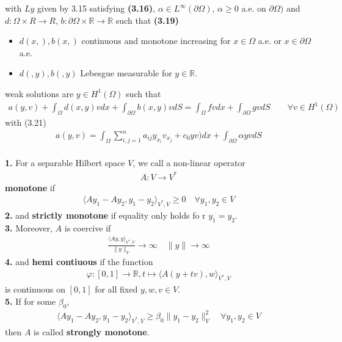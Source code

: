 with $Ly$ given by 3.15 satisfying\textbf{ (3.16)}, $\alpha \in L^\infty(\partial \Omega)$, $\alpha \geq 0$ a.e. on $\partial \Omega)$ and $d: \Omega \times R \rightarrow R$, $b: \partial \Omega \times \mathbb{R} \rightarrow \mathbb{R}$ such that \textbf{(3.19)}
\begin{itemize}
	\item $d(x, ), b(x, )$ continuous and monotone increasing for $x \in \Omega$ a.e. or $x \in \partial \Omega$ a.e. 
	\item $d(, y), b(,y )$ Lebesgue measurable for $y \in \mathbb{R}$. 
\end{itemize}
weak solutions are $y \in H^1(\Omega)$ such that
\begin{align*}
	a(y, v) + \int_\Omega d(x, y) v dx + \int_{\partial \Omega} b(x, y) v dS 
	= \int_\Omega fv dx + \int_{\partial \Omega} gv dS \qquad \forall v \in H^1(\Omega)
\end{align*}
with (3.21)
\begin{align*}
	a(y, v) = \int_{\Omega} \sum_{i, j = 1}^n a_{ij} y_{x_i} v_{x_j} + c_0yv)dx + \int_{\partial \Omega} \alpha y v dS
\end{align*}
\qquad\\
\textbf{1.} For a separable Hilbert space $V$, we call a non-linear operator
\begin{align*}
	A: V \rightarrow V^*
\end{align*}
\textbf{monotone} if 
\begin{align*}
	\langle Ay_1 - Ay_2, y_1 - y_2 \rangle_{V^*, V} \ge 0 \quad \forall y_1, y_2 \in V
\end{align*}
\textbf{2.} and \textbf{strictly monotone} if equality only holds fo r $y_1 = y_2$. \\
\textbf{3. }Moreover, $A$ is coercive if 
\begin{align*}
	\frac{\langle Ay, y \rangle_{V^*, V}}{\|y\|_V} \rightarrow \infty \quad \|y\| \rightarrow \infty
\end{align*}
\textbf{4.} and \textbf{hemi contiuous} if the function
\begin{align*}
	\varphi:[0, 1] \rightarrow \mathbb{R}, t \mapsto \langle A(y + tv), w \rangle_{V^*, V}
\end{align*}
is continuous on $[0, 1]$ for all fixed $y, w, v \in V$. \\
\textbf{5.} If for some $\beta_0$, 
\begin{align*}
	\langle Ay_1 - Ay_2, y_1 - y_2 \rangle_{V^*, V} \geq \beta_0\|y_1 - y_2\|_V^2 \quad \forall y_1, y_2 \in V
\end{align*}
then $A$ is called \textbf{strongly monotone}. 


